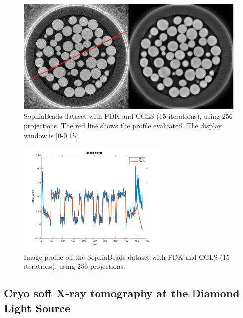 \begin{figure}
\begin{center}

\includegraphics[width=\textwidth]{Applications/sophiaFDKCGLS.png} 

\end{center}

\caption[SophiaBeads dataset with FDK and CGLS]{\label{fig:sophia1} SophiaBeads dataset with FDK and CGLS (15 iterations), using 256 projections. The red line shows the profile evaluated. The display window is [0-0.15]. } 
\end{figure}
\begin{figure}
\begin{center}

\includegraphics[width=0.65\textwidth]{Applications/spophiaprofile.png} 

\end{center}

\caption[SophiaBeads dataset with FDK and CGLS]{\label{fig:sophiaprofile} Image profile on the SophiaBeads dataset with FDK and CGLS (15 iterations), using 256 projections.} 
\end{figure}


\FloatBarrier
\subsection{Cryo soft X-ray tomography at the Diamond Light Source}

